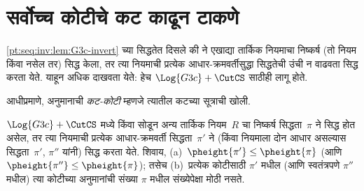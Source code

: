 \section{सर्वोच्च कोटीचे कट काढून टाकणे}\label{pt:cut:inv:sec}

\ref{pt:seq:inv:lem:G3c-invert} च्या सिद्धतेत दिसले
की  ने एखाद्या तार्किक नियमाचा निष्कर्ष
(तो नियम \RightR{\lexists} किंवा \LeftR{\lforall}
नसेल तर) सिद्ध केला, तर त्या नियमाची प्रत्येक
आधार-क्रमवर्तीसुद्धा सिद्धतेची उंची न वाढवता
सिद्ध करता येते. याहून अधिक दाखवता येते:
हेच $\Log{G3c} + \CutCS$ साठीही लागू होते.

आधीप्रमाणे, \CutCS{} अनुमानाची \emph{कट-कोटी}
म्हणजे त्यातील कटच्या सूत्राची खोली.

\begin{lem}\label{pt:cut:inv:lem:inv-G3c-cut}
$\Log{G3c} + \CutCS$ मध्ये \RightR{\lexists}
किंवा \LeftR{\lforall} सोडून अन्य तार्किक नियम~$R$
चा निष्कर्ष सिद्धता~$\pi$ ने सिद्ध होत असेल,
तर त्या नियमाची प्रत्येक आधार-क्रमवर्ती
सिद्धता~$\pi'$ ने (किंवा नियमाला दोन आधार
असल्यास सिद्धता~$\pi'$, $\pi''$ यांनी)
सिद्ध करता येते. शिवाय,
(a)~$\pheight{\pi'}\le\pheight{\pi}$ (आणि
$\pheight{\pi''}\le\pheight{\pi}$);
तसेच (b)~प्रत्येक कोटीसाठी $\pi'$ मधील
(आणि स्वतंत्रपणे $\pi''$ मधील) त्या कोटीच्या
\CutCS{} अनुमानांची संख्या $\pi$ मधील संख्येपेक्षा
मोठी नसते.
\end{lem}

